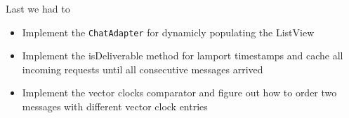 \documentclass{report}
\begin{document}
Last we had to
\begin{itemize}
  \item Implement the \texttt{ChatAdapter} for dynamicly populating the ListView
  \item Implement the isDeliverable method for lamport timestamps and cache all incoming requests until all consecutive messages arrived
  \item Implement the vector clocks comparator and figure out how to order two messages with different vector clock entries
\end{itemize}


\end{document}

